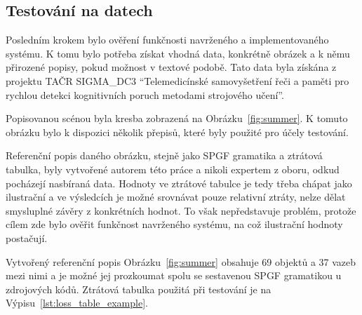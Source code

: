 \subsection{Testování na datech}
Posledním krokem bylo ověření funkčnosti navrženého a implementovaného systému.
K tomu bylo potřeba získat vhodná data, konkrétně obrázek a k němu přirozené popisy, pokud možnost v textové podobě.
Tato data byla získána z projektu TAČR SIGMA\_DC3 \enquote{Telemedicínské samovyšetření řeči a paměti pro rychlou detekci kognitivních poruch metodami strojového učení}.

Popisovanou scénou byla kresba zobrazená na Obrázku~\ref{fig:summer}.
K tomuto obrázku bylo k dispozici několik přepisů, které byly použité pro účely testování.

Referenční popis daného obrázku, stejně jako SPGF gramatika a ztrátová tabulka,
byly vytvořené autorem této práce a nikoli expertem z oboru, odkud pocházejí nasbíraná data.
Hodnoty ve ztrátové tabulce je tedy třeba chápat jako ilustrační a ve výsledcích je možné srovnávat pouze relativní ztráty,
nelze dělat smysluplné závěry z konkrétních hodnot.
To však nepředstavuje problém, protože cílem zde bylo ověřit funkčnost navrženého systému, na což ilustrační hodnoty postačují.

Vytvořený referenční popis Obrázku~\ref{fig:summer} obsahuje 69 objektů a 37 vazeb mezi nimi a je možné jej prozkoumat spolu se sestavenou SPGF gramatikou u zdrojových kódů.
Ztrátová tabulka použitá při testování je na Výpisu~\ref{lst:loss_table_example}.



